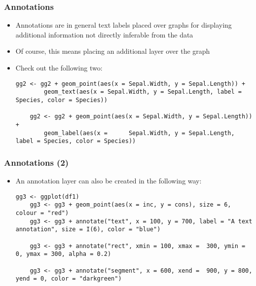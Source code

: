 \documentclass[10pt]{beamer}
\theoremstyle{definition}
\begin{document}
\begin{frame}[fragile]
\frametitle{Annotations}
\begin{itemize}
	\item Annotations are in general text labels placed over graphs for displaying additional information not directly inferable from the data
	\item Of course, this means placing an additional layer over the graph
	\item Check out the following two:
	\begin{lstlisting}[style = rstyle, breaklines]
	gg2 <- gg2 + geom_point(aes(x = Sepal.Width, y = Sepal.Length)) +
		geom_text(aes(x = Sepal.Width, y = Sepal.Length, label = Species, color = Species))
		
	gg2 <- gg2 + geom_point(aes(x = Sepal.Width, y = Sepal.Length)) + 
    	geom_label(aes(x = 		Sepal.Width, y = Sepal.Length, label = Species, color = Species))
	\end{lstlisting}
\end{itemize}
\end{frame}

\begin{frame}[fragile]
\frametitle{Annotations (2)}
\begin{itemize}
	\item An annotation layer can also be created in the following way:
	\begin{lstlisting}[style = rstyle, breaklines]
	gg3 <- ggplot(df1)
	gg3 <- gg3 + geom_point(aes(x = inc, y = cons), size = 6, colour = "red")
	gg3 <- gg3 + annotate("text", x = 100, y = 700, label = "A text annotation", size = I(6), color = "blue")

	gg3 <- gg3 + annotate("rect", xmin = 100, xmax =  300, ymin = 0, ymax = 300, alpha = 0.2)

	gg3 <- gg3 + annotate("segment", x = 600, xend =  900, y = 800, yend = 0, color = "darkgreen")
	\end{lstlisting}
\end{itemize}
\end{frame}
\end{document}
